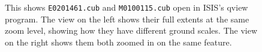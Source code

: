 \begin{figure}[b!]
\begin{minipage}{5.2in}
\end{minipage}
\hfill
\begin{minipage}{1.3in}
\caption[P19 images open in qview zoomed in]{
    \label{p19-images}
    This shows \texttt{E0201461.cub} and \texttt{M0100115.cub} open in
        ISIS's qview program.  The view on the left shows their full extents
        at the same zoom level, showing how they have different ground scales.
        The view on the right shows them both zoomed in on the same feature.
    }
\end{minipage}
\end{figure}

%
%
%
%
%
%
%
%
%
%
%
%
